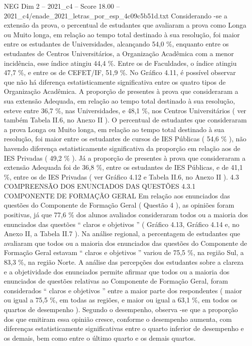 \begin{textsample}{NEG Dim 2 – 2021\_c4 – Score 18.00 – 2021\_c4/enade\_2021\_letras\_por\_esp\_4c09c5b51d.txt}
Considerando -se a extensão da prova, o percentual de estudantes que avaliaram a prova como Longa ou Muito longa, em relação ao tempo total destinado à sua resolução, foi maior entre os estudantes de Universidades, alcançando 54,0 \%, enquanto entre os estudantes de Centros Universitários, a Organização Acadêmica com a menor incidência, esse índice atingiu 44,4 \%.
Entre os de Faculdades, o índice atingiu 47,7 \%, e entre os de CEFET/IF, 51,9 \%.
No Gráfico 4.11, é possível observar que não há diferença estatisticamente significativa entre os quatro tipos de Organização Acadêmica.
A proporção de presentes à prova que consideraram a sua extensão Adequada, em relação ao tempo total destinado à sua resolução, esteve entre 36,7 \%, nas Universidades, e 48,1 \%, nos Centros Universitários ( ver também Tabela II.6, no Anexo II ).
O percentual de estudantes que consideraram a prova Longa ou Muito longa, em relação ao tempo total destinado à sua resolução, foi maior entre os estudantes de cursos de IES Públicas ( 54,6 \% ), não havendo diferença estatisticamente significativa da proporção em relação aos de IES Privadas ( 49,2 \% ).
Já a proporção de presentes à prova que consideraram a extensão Adequada foi de 36,8 \%, entre os estudantes de IES Públicas, e de 41,1 \%, entre os de IES Privadas ( ver Gráfico 4.12 e Tabela II.6, no Anexo II ). 4.3 COMPREENSÃO DOS ENUNCIADOS DAS QUESTÕES 4.3.1 COMPONENTE DE FORMAÇÃO GERAL Em relação aos enunciados das questões do Componente de Formação Geral ( Questão 4 ), as opiniões foram positivas, já que 77,6 \% dos alunos avaliados consideraram todos ou a maioria dos enunciados das questões “ claros e objetivos ” ( Gráfico 4.13, Gráfico 4.14 e, no Anexo II, a Tabela II.7 ).
Na análise regional, a percentagem de estudantes que avaliaram que todos ou a maioria dos enunciados das questões do Componente de Formação Geral estavam “ claros e objetivos ” variou de 75,5 \%, na região Sul, a 83,3 \%, na região Norte.
A análise das percepções dos estudantes sobre a clareza e a objetividade dos enunciados permite afirmar que todos ou a maioria dos enunciados de questões relativas ao Componente de Formação Geral, foram considerados “ claros e objetivos ” entre a maior parte dos respondentes ( maior ou igual a 75,5 \%, em todas as regiões, e maior ou igual a 63,1 \%, em todos os quartos de desempenho ).
Segundo o desempenho, observa -se que a proporção dos que emitiram essa opinião cresce, conforme o desempenho aumenta, com diferenças estatisticamente significativas entre o quarto inferior de desempenho e os demais, bem como entre o último quarto e os demais quartos.

\end{textsample}
